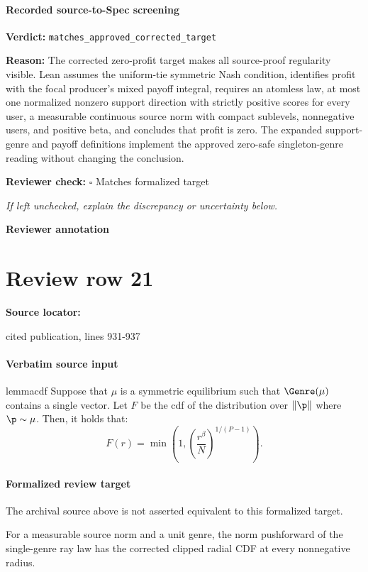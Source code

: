 \documentclass[10pt]{article}
\newcommand{\reviewerbox}{%
  \par\noindent\fbox{\parbox{0.96\linewidth}{\rule{0pt}{0.38in}}}\par
}
\newcommand{\reviewmatch}[1]{%
  \par\noindent\textbf{Reviewer check:} $\square$\; #1\par
  \noindent\emph{If left unchecked, explain the discrepancy or uncertainty below.}\par
}
\begin{document}
\paragraph{Recorded source-to-Spec screening}
\textbf{Verdict:} \texttt{matches\_approved\_corrected\_target}
\\
{\raggedright
\textbf{Reason:} The corrected zero-\allowbreak{}profit target makes all source-\allowbreak{}proof regularity visible.\allowbreak{} Lean assumes the uniform-\allowbreak{}tie symmetric Nash condition, identifies profit with the focal producer's mixed payoff integral, requires an atomless law, at most one normalized nonzero support direction with strictly positive scores for every user, a measurable continuous source norm with compact sublevels, nonnegative users, and positive beta, and concludes that profit is zero.\allowbreak{} The expanded support-\allowbreak{}genre and payoff definitions implement the approved zero-\allowbreak{}safe singleton-\allowbreak{}genre reading without changing the conclusion.\allowbreak{}
\par}
\reviewmatch{Matches formalized target}
\noindent\textbf{Reviewer annotation}\par
\reviewerbox
\clearpage
\hypertarget{source-claim-ad0a52650a7233e7}{}
\section*{Review row 21}
\textbf{Source locator:} {\footnotesize\raggedright cited publication, lines 931-\allowbreak{}937\par}
\paragraph{Verbatim source input}
\begin{ReviewVerbatim}
\begin{restatable}{lemma}{cdf}
\label{lemma:cdf}
Suppose that $\mu$ is a symmetric equilibrium such that $\Genre(\mu)$ contains a single vector. Let $F$ be the cdf of the distribution over $\|\p\|$ where $\p \sim \mu$. Then, it holds that:
\begin{equation}
F(r) = \min\left(1, \left(\frac{r^{\beta}}{N}\right)^{1/(P-1)}\right).
\end{equation}
\end{restatable}
\end{ReviewVerbatim}


\paragraph{Formalized review target}
The archival source above is not asserted equivalent to this formalized target.
\begin{ReviewVerbatim}
For a measurable source norm and a unit genre, the norm pushforward of the single-genre ray law has the corrected clipped radial CDF at every nonnegative radius.
\end{ReviewVerbatim}
\end{document}
